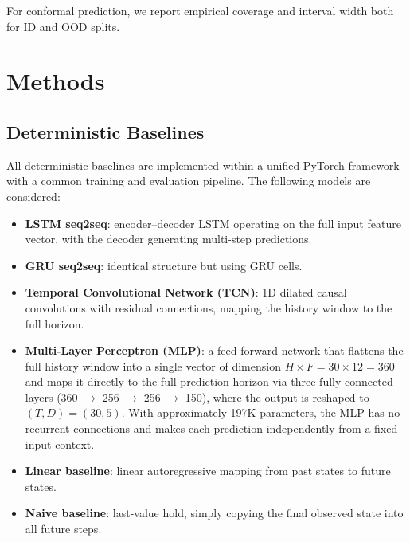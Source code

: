 \documentclass[a4paper,fleqn]{cas-sc}
\begin{document}
For conformal prediction, we report empirical coverage and interval width both for ID and OOD splits.

\section{Methods}

\subsection{Deterministic Baselines}

All deterministic baselines are implemented within a unified PyTorch framework with a common training and evaluation pipeline. The following models are considered:
\begin{itemize}
    \item \textbf{LSTM seq2seq}: encoder--decoder LSTM operating on the full input feature vector, with the decoder generating multi-step predictions.
    \item \textbf{GRU seq2seq}: identical structure but using GRU cells.
    \item \textbf{Temporal Convolutional Network (TCN)}: 1D dilated causal convolutions with residual connections, mapping the history window to the full horizon.
    \item \textbf{Multi-Layer Perceptron (MLP)}: a feed-forward network that flattens 
the full history window into a single vector of dimension $H \times F = 30 \times 12 = 360$ 
and maps it directly to the full prediction horizon via three fully-connected layers 
(360 $\to$ 256 $\to$ 256 $\to$ 150), where the output is reshaped to $(T, D) = (30, 5)$. 
With approximately 197K parameters, the MLP has no recurrent connections and makes 
each prediction independently from a fixed input context.
    \item \textbf{Linear baseline}: linear autoregressive mapping from past states to future states.
    \item \textbf{Naive baseline}: last-value hold, simply copying the final observed state into all future steps.
\end{itemize}
\end{document}
